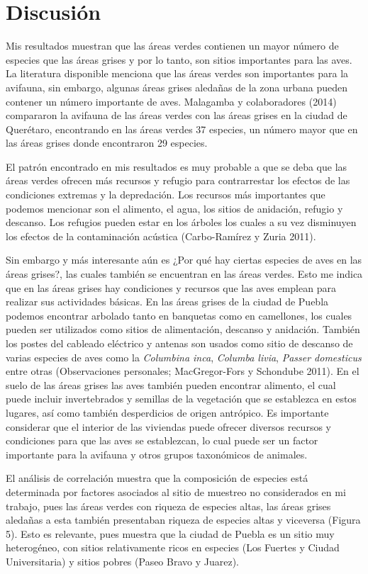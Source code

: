\documentclass[letterpaper,12pt]{article}
\begin{document}
\section{Discusión}
Mis resultados muestran que las áreas verdes contienen un mayor número de especies que las áreas grises y por lo tanto, son sitios importantes para las aves. La literatura disponible menciona que las áreas verdes son importantes para la avifauna, sin embargo, algunas áreas grises aledañas  de la zona urbana pueden contener un número importante de aves. Malagamba y colaboradores (2014) compararon la avifauna de las áreas verdes con las áreas grises en la ciudad de Querétaro, encontrando en  las áreas verdes 37 especies, un número mayor que en las áreas grises donde encontraron 29 especies.

El patrón encontrado en mis resultados es muy probable a que se deba que las áreas verdes ofrecen más recursos y refugio para contrarrestar los efectos de las  condiciones extremas y la depredación. Los recursos más importantes que podemos mencionar son el alimento, el agua, los sitios de anidación, refugio y descanso. Los refugios pueden estar en los árboles los cuales a su vez disminuyen los efectos de la contaminación acústica (Carbo-Ramírez y Zuria 2011).

Sin embargo y más interesante aún es ¿Por qué hay ciertas especies de aves en las áreas grises?, las cuales también se encuentran en las áreas verdes. Esto me indica que en las áreas grises hay condiciones y recursos que las aves emplean para realizar sus actividades básicas. En las áreas grises de la ciudad de Puebla podemos encontrar arbolado tanto en banquetas como en camellones, los cuales pueden ser utilizados como sitios de alimentación, descanso y anidación. También los postes del cableado eléctrico y antenas son usados como sitio de descanso de varias especies de aves como la \textit{Columbina inca}, \textit{Columba livia}, \textit{Passer domesticus} entre otras (Observaciones personales; MacGregor-Fors y Schondube 2011). En el suelo de las áreas grises las aves también pueden encontrar alimento, el cual puede incluir invertebrados y semillas de la vegetación que se establezca en estos lugares, así como también desperdicios de origen antrópico. Es importante considerar que el interior de las viviendas puede ofrecer diversos recursos y condiciones para que las aves se establezcan, lo cual puede ser un factor importante para la avifauna y otros grupos taxonómicos de animales.

El análisis de correlación muestra que la composición de especies está determinada por factores asociados al sitio de muestreo no considerados en mi trabajo, pues las áreas verdes con riqueza de especies altas, las áreas grises aledañas a esta también presentaban riqueza de especies altas y viceversa (Figura 5). Esto es relevante, pues muestra que la ciudad de Puebla es un sitio muy heterogéneo, con sitios relativamente ricos en especies (Los Fuertes y Ciudad Universitaria) y sitios pobres (Paseo Bravo y Juarez).
\end{document}

